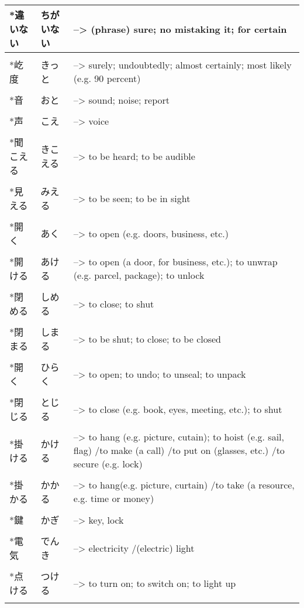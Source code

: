 \documentclass{article}
\begin{document}
\begin{tabular}{ l | l p{13cm} }
*違いない&ちがいない&--> (phrase) sure; no mistaking it; for certain \\ \hline\\[-1em]
*屹度&きっと&--> surely; undoubtedly; almost certainly; most likely (e.g. 90 percent) \\ \hline\\[-1em]
*音&おと&--> sound; noise; report \\ \hline\\[-1em]
*声&こえ&--> voice \\ \hline\\[-1em]
*聞こえる&きこえる&--> to be heard; to be audible \\ \hline\\[-1em]
*見える&みえる&--> to be seen; to be in sight \\ \hline\\[-1em]
*開く&あく&--> to open (e.g. doors, business, etc.) \\ \hline\\[-1em]
*開ける&あける&--> to open (a door, for business, etc.); to unwrap (e.g. parcel, package); to unlock \\ \hline\\[-1em]
*閉める&しめる&--> to close; to shut \\ \hline\\[-1em]
*閉まる&しまる&--> to be shut; to close; to be closed \\ \hline\\[-1em]
*開く&ひらく&--> to open; to undo; to unseal; to unpack \\ \hline\\[-1em]
*閉じる&とじる&--> to close (e.g. book, eyes, meeting, etc.); to shut \\ \hline\\[-1em]
*掛ける&かける&--> to hang (e.g. picture, cutain); to hoist (e.g. sail, flag) /to make (a call) /to put on (glasses, etc.) /to secure (e.g. lock) \\ \hline\\[-1em]
*掛かる&かかる&--> to hang(e.g. picture, curtain) /to take (a resource, e.g. time or money) \\ \hline\\[-1em]
*鍵&かぎ&--> key, lock \\ \hline\\[-1em]
*電気&でんき&--> electricity /(electric) light \\ \hline\\[-1em]
*点ける&つける&--> to turn on; to switch on; to light up \\ \hline\\[-1em]

\end{tabular}
\end{document}
